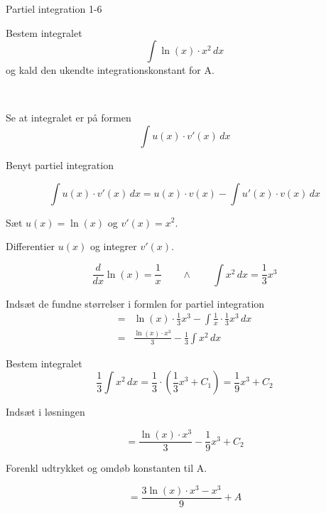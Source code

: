 \documentclass{article}
\begin{document}
\begin{exercise}{Partiel integration 1-6}
	
	
	Bestem integralet
	\[
	\int \ln(x) \cdot x^2 \, dx
	\]
	og kald den ukendte integrationskonstant for A.
	
	 \\
	
	
	\hint
	
	Se at integralet er på formen
	\[
	\int u(x) \cdot v'(x) \, dx
	\]
	
	\hint
	
	Benyt partiel integration
	
	\hint
	\[
	\int u(x) \cdot v'(x)\, dx = u(x) \cdot v(x) - \int u'(x) \cdot v(x) \, dx
	\]
	\hint
	
	Sæt $u(x) = \ln(x)$ og $v'(x) = x^2$.
	
	
	\hint
	
	Differentier $u(x)$ og integrer $v'(x)$.
	
	\hint
	\[
	\frac{d}{dx}\ln(x)= \frac{1}{x} \qquad \wedge \qquad \int x^2 \, dx = \frac{1}{3}x^3
	\]
	
	\hint
	
	Indsæt de fundne størrelser i formlen for partiel integration
	\begin{align*}
	=& \ln(x) \cdot \frac{1}{3}x^3 - \int \frac{1}{x} \cdot \frac{1}{3}x^3 \, dx\\
	=& \frac{\ln(x) \cdot x^3}{3} - \frac{1}{3} \int x^2 \, dx
	\end{align*}
	
	\hint
	
	Bestem integralet
	\[
	\frac{1}{3} \int x^2 \, dx = \frac{1}{3} \cdot \left( \frac{1}{3}x^3 + C_1 \right)= \frac{1}{9}x^3 + C_2
	\]
	
	\hint
	Indsæt i løsningen 
	
	\hint
	
	\[
	= \frac{\ln(x) \cdot x^3}{3} - \frac{1}{9}x^3 + C_2
	\]
	
	\hint
	
	Forenkl udtrykket og omdøb konstanten til A.
	
	\hint
	
	\[
	= \frac{3\ln(x) \cdot x^3 - x^3}{9}  + A
	\]
	
	
\end{exercise}

\newpage
\end{document}
